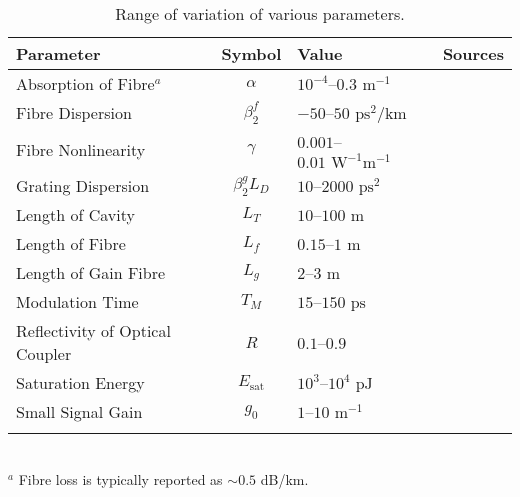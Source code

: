 \documentclass[graybox]{svmult}
\newcommand{\Es}{E_{\textrm{sat}}}
\begin{document}
\begin{table}[tbp]
	\caption{Range of variation of various parameters.}
	\label{tab:values}
	\centering
	\begin{tabular}{lcll}
		\hline\noalign{\smallskip}
		Parameter & Symbol & Value & Sources \\
		\hline\noalign{\smallskip}
		Absorption of Fibre$^a$& $\alpha$ & $10^{-4}$--$0.3\text{ m}^{-1}$  & \cite{burgoyneemail, shtyrina, tomlinson, usechak, yarutkina} \\
		Fibre Dispersion & $\beta_2^f$ & $-50$--$50 \text{ ps}^2/ \text{km}$ & \cite{agrawal2002, agrawal2013, burgoyne2014, litchinitser, peng, yarutkina} \\
		Fibre Nonlinearity & $\gamma$ & $0.001$--$0.01 \text{ W}^{-1} \text{m}^{-1}$ & \cite{agrawal2013, finot, usechak, yarutkina} \\
		Grating Dispersion & $\beta_2^g L_D$ & $10$--$2000 \text{ ps}^2$ & \cite{agrawal2002, agrawal2013, burgoyne2014, li} \\
		Length of Cavity & $L_T$ & $10$--$100 \text{ m}$ & \cite{burgoyneemail, peng, tamura1996} \\
		Length of Fibre & $L_f$ & $0.15$--$1 \text{ m}$ & \cite{burgoyneemail} \\
		Length of Gain Fibre & $L_g$ & $2$--$3 \text{ m}$ & \cite{burgoyne2014, peng, shtyrina, tamura1993, yarutkina} \\
		Modulation Time & $T_M$ & $15$--$150 \text{ ps}$ & \cite{bohun, burgoyneemail, burgoyne2014} \\
		Reflectivity of Optical Coupler & $R$ & $0.1$--$0.9$ & \cite{burgoyneemail, li, peng,  tamura1993, tamura1996, yamashita} \\
		Saturation Energy & $\Es$ & $10^3$--$10^4 \text{ pJ}$ & \cite{burgoyneemail, usechak, yarutkina} \\
		Small Signal Gain & $g_0$ & $1$--$10 \text{ m}^{-1}$ & \cite{burgoyneemail, yarutkina} \\
		\noalign{\smallskip}\hline\noalign{\smallskip}
	\end{tabular} \\
	$^a$  Fibre loss is typically reported as $\sim0.5$ dB/km.
\end{table}
\end{document}
